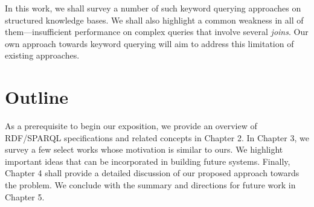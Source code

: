 In this work, we shall survey a number of such keyword querying approaches on structured knowledge bases. We shall also highlight a common weakness in all of them---insufficient performance on complex queries that involve several \emph{joins}. Our own approach towards keyword querying will aim to address this limitation of existing approaches.

\section{Outline}

As a prerequisite to begin our exposition, we provide  an overview of RDF/SPARQL specifications and related concepts in Chapter 2. In Chapter 3, we survey a few select works whose motivation is similar to ours. We highlight important ideas that can be incorporated in building future systems. Finally, Chapter 4 shall provide a detailed discussion of our proposed approach towards the problem. We conclude with the summary and directions for future work in Chapter 5.
